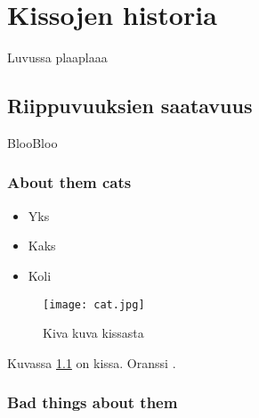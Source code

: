 \chapter{Kissojen historia} \label{web}
Luvussa plaaplaaa
	\section{Riippuvuuksien saatavuus} 
	BlooBloo
		\subsection{About them cats} 

		\begin{itemize}
		  \item Yks
		  \item Kaks
		  \item Koli
		\end{itemize} 

		\begin{figure}[H]
  	    	\centering
    		\texttt{[image: cat.jpg]}
  			\caption{Kiva kuva kissasta}
  			\label{cat}
		\end{figure}

		Kuvassa \ref{cat} on kissa. Oranssi \cite{Orange:2013}.  

		\subsection{Bad things about them} 

		